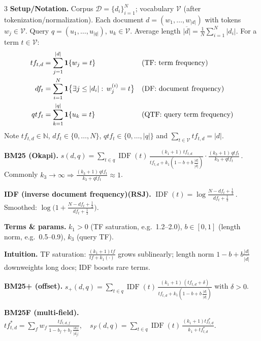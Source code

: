 \documentclass[10pt,landscape]{article}
\begin{document}
\begin{multicols}{3}
    \textbf{Setup/Notation.}
    Corpus $\mathcal{D}=\{d_i\}_{i=1}^N$; vocabulary $\mathcal{V}$ (after tokenization/normalization).
    Each document $d=(w_1,\dots,w_{|d|})$ with tokens $w_j\in\mathcal{V}$.
    Query $q=(u_1,\dots,u_{|q|})$, $u_k\in\mathcal{V}$.
    Average length $\displaystyle \overline{|d|}=\frac{1}{N}\sum_{i=1}^N |d_i|$.
    For a term $t\in\mathcal{V}$:
    \[
        \begin{aligned}
            tf_{t,d} & = \sum_{j=1}^{|d|}\mathbf{1}\{w_j=t\}                                  &  & \text{(TF: term frequency)}        \\
            df_t     & = \sum_{i=1}^N \mathbf{1}\big\{\exists j\le |d_i|:\, w^{(i)}_j=t\big\} &  & \text{(DF: document frequency)}    \\
            qtf_t    & = \sum_{k=1}^{|q|}\mathbf{1}\{u_k=t\}                                  &  & \text{(QTF: query term frequency)}
        \end{aligned}
    \]
    Note $tf_{t,d}\in\mathbb{N}$, $df_t\in\{0,\dots,N\}$, $qtf_t\in\{0,\dots,|q|\}$ and $\sum_{t\in\mathcal{V}} tf_{t,d}=|d|$.

    \textbf{BM25 (Okapi).}
    $\displaystyle s(d,q)=\sum_{t\in q} \operatorname{IDF}(t)\,
        \frac{(k_1+1)\,tf_{t,d}}{tf_{t,d}+k_1\!\left(1-b+b\,\tfrac{|d|}{\overline{|d|}}\right)}
        \cdot\frac{(k_3+1)\,qtf_t}{k_3+qtf_t}\,.$
    \; Commonly $k_3\!\to\!\infty\Rightarrow\frac{(k_3+1)\,qtf_t}{k_3+qtf_t}\!\approx\!1$.

    \textbf{IDF (inverse document frequency)(RSJ).}
    $\displaystyle \operatorname{IDF}(t)=\log\frac{N-df_t+\tfrac12}{df_t+\tfrac12}\,.$
    \; Smoothed: $\displaystyle \log\!\Big(1+\frac{N-df_t+\tfrac12}{df_t+\tfrac12}\Big)$.

    \textbf{Terms \& params.}
    $k_1{>}0$ (TF saturation, e.g.\ 1.2–2.0), $b\in[0,1]$ (length norm, e.g.\ 0.5–0.9), $k_3$ (query TF).

    \textbf{Intuition.}
    TF saturation: $\frac{(k_1+1)tf}{tf+k_1(\cdot)}$ grows sublinearly; length norm $1-b+b\frac{|d|}{\overline{|d|}}$ downweights long docs; IDF boosts rare terms.

    \textbf{BM25+ (offset).}
    $\displaystyle s_+(d,q)=\sum_{t\in q}\operatorname{IDF}(t)\,
        \frac{(k_1+1)\,(tf_{t,d}+\delta)}{tf_{t,d}+k_1\!\left(1-b+b\,\tfrac{|d|}{\overline{|d|}}\right)}$ with $\delta{>}0$.

    \textbf{BM25F (multi-field).}
    $\displaystyle tf^{\!*}_{t,d}=\sum_f w_f\,\frac{tf_{t,d,f}}{1-b_f+b_f\,\tfrac{|d_f|}{\overline{|d_f|}}},\quad
        s_F(d,q)=\sum_{t\in q}\operatorname{IDF}(t)\,\frac{(k_1+1)tf^{\!*}_{t,d}}{k_1+tf^{\!*}_{t,d}}$.


\end{multicols}
\end{document}
